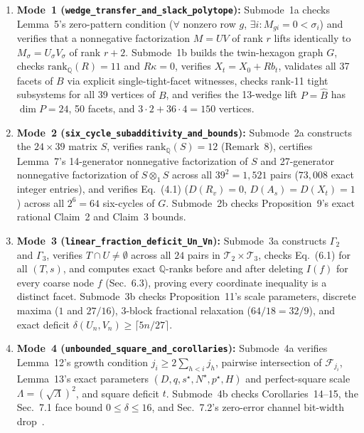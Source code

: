 \documentclass[10pt,twocolumn]{article}
\begin{document}
\begin{enumerate}\itemsep 1.5pt
\item \textbf{Mode~1 (\nolinkurl{wedge_transfer_and_slack_polytope}):} Submode~1a checks Lemma~5's zero-pattern condition ($\forall$ nonzero row $g$, $\exists i: M_{gi}=0<\sigma_i$) and verifies that a nonnegative factorization $M=UV$ of rank $r$ lifts identically to $M_\sigma = U_\sigma V_\sigma$ of rank $r+2$. Submode~1b builds the twin-hexagon graph $G$, checks $\mathrm{rank}_{\mathbb{Q}}(R)=11$ and $R\kappa=0$, verifies $X_t = X_0 + R b_t$, validates all 37 facets of $B$ via explicit single-tight-facet witnesses, checks rank-11 tight subsystems for all 39 vertices of $B$, and verifies the 13-wedge lift $P=\hat{B}$ has $\dim P=24$, 50 facets, and $3\cdot 2+36\cdot 4=150$ vertices.
\item \textbf{Mode~2 (\nolinkurl{six_cycle_subadditivity_and_bounds}):} Submode~2a constructs the $24\times 39$ matrix $S$, verifies $\mathrm{rank}_{\mathbb{Q}}(S)=12$ (Remark~8), certifies Lemma~7's 14-generator nonnegative factorization of $S$ and 27-generator nonnegative factorization of $S\otimes_1 S$ across all $39^2 = 1{,}521$ pairs ($73{,}008$ exact integer entries), and verifies Eq.~(4.1) ($D(R_v)=0$, $D(A_s)=D(X_t)=1$) across all $2^6 = 64$ six-cycles of $G$. Submode~2b checks Proposition~9's exact rational Claim~2 and Claim~3 bounds.
\item \textbf{Mode~3 (\nolinkurl{linear_fraction_deficit_Un_Vn}):} Submode~3a constructs $\Gamma_2$ and $\Gamma_3$, verifies $T\cap U\neq\emptyset$ across all $24$ pairs in $\mathcal{T}_2\times\mathcal{T}_3$, checks Eq.~(6.1) for all $(T,s)$, and computes exact $\mathbb{Q}$-ranks before and after deleting $I(f)$ for every coarse node $f$ (Sec.~6.3), proving every coordinate inequality is a distinct facet. Submode~3b checks Proposition~11's scale parameters, discrete maxima ($1$ and $27/16$), 3-block fractional relaxation ($64/18=32/9$), and exact deficit $\delta(U_n,V_n)\ge\lceil 5n/27\rceil$.
\item \textbf{Mode~4 (\nolinkurl{unbounded_square_and_corollaries}):} Submode~4a verifies Lemma~12's growth condition $j_i \ge 2\sum_{h<i}j_h$, pairwise intersection of $\mathcal{F}_{j_i}$, Lemma~13's exact parameters $(D,q,s^\star,N^\star,p^\star,H)$ and perfect-square scale $\Lambda = (\sqrt{\Lambda})^2$, and square deficit $t$. Submode~4b checks Corollaries~14--15, the Sec.~7.1 face bound $0\le\delta\le 16$, and Sec.~7.2's zero-error channel bit-width drop~\cite{CohenRothblum1993}.
\end{enumerate}
\end{document}
